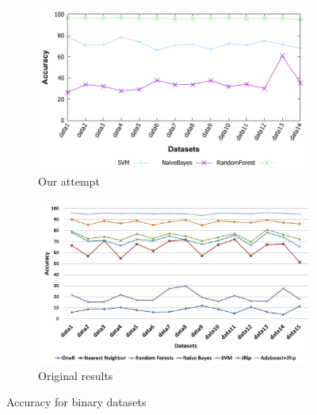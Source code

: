 \begin{figure}[H]
    \centering
    \begin{subfigure}[t]{0.5\textwidth}
        \includegraphics[width=\linewidth]{images/weka_accuracy2}
        \caption{Our attempt}
    \end{subfigure}%
    \begin{subfigure}[t]{0.5\textwidth}
        \includegraphics[width=\linewidth]{images/weka_accuracy2_cite.png}
        \caption{Original results \cite{borges_hink_machine_2014-1}}
    \end{subfigure}
    \caption{Accuracy for binary datasets}
    \label{fig:weka_acc2}
\end{figure}

